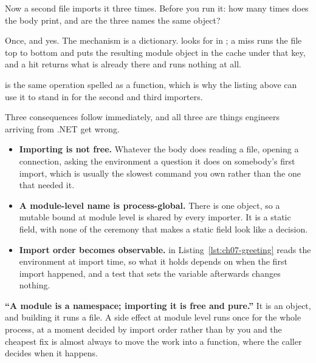 \noindent
Now a second file imports it three times. Before you run it: how many times
does the body print, and are the three names the same object?



\noindent
Once, and yes. The mechanism is a dictionary.  looks for
 in ; a miss runs the file top to bottom and puts
the resulting module object in the cache under that key, and a hit returns
what is already there and runs nothing at all.

 is the same operation spelled as a function,
which is why the listing above can use it to stand in for the second and
third importers.


\noindent
Three consequences follow immediately, and all three are things engineers
arriving from .NET get wrong.

\begin{itemize}[leftmargin=1.4em, itemsep=3pt]
  \item \textbf{Importing is not free.} Whatever the body does \dash{}
        reading a file, opening a connection, asking the environment a
        question \dash{} it does on somebody's first import, which is
        usually the slowest command you own rather than the one that needed
        it.
  \item \textbf{A module-level name is process-global.} There is one object,
        so a mutable bound at module level is shared by every importer. It
        is a static field, with none of the ceremony that makes a static
        field look like a decision.
  \item \textbf{Import order becomes observable.}  in
        Listing~\ref{lst:ch07-greeting} reads the environment at import
        time, so what it holds depends on when the first import happened,
        and a test that sets the variable afterwards changes nothing.
\end{itemize}

\begin{trapbox}
\textbf{\enquote{A module is a namespace; importing it is free and pure.}}
It is an object, and building it runs a file. A side effect at module level
runs once for the whole process, at a moment decided by import order rather
than by you \dash{} and the cheapest fix is almost always to move the work
into a function, where the caller decides when it happens.
\end{trapbox}

